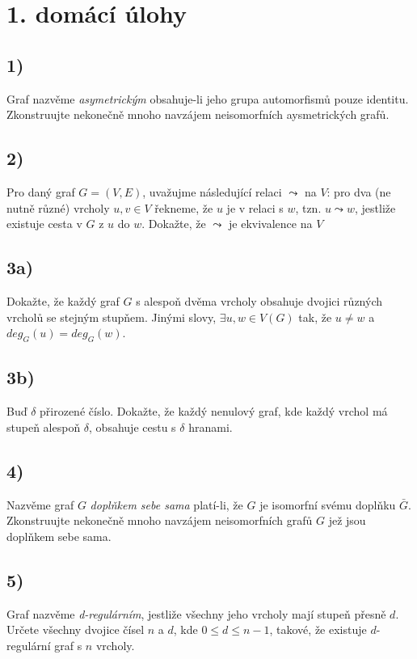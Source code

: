 \documentclass[../main.tex]{subfiles}
\begin{document}
\section*{1. domácí úlohy}

\subsection*{1)}
Graf nazvěme \textit{asymetrickým} obsahuje-li jeho grupa automorfismů pouze identitu.
Zkonstruujte nekonečně mnoho navzájem neisomorfních aysmetrických grafů.

\subsection*{2)}
Pro daný graf $G=(V,E)$, uvažujme následující relaci $\leadsto$ na $V$: pro dva (ne nutně různé) vrcholy $u,v\in V$ řekneme, že 
$u$ je v relaci s $w$, tzn. $u\leadsto w$, jestliže existuje cesta v $G$ z $u$ do $w$. Dokažte, že $\leadsto$ je ekvivalence na $V$



\subsection*{3a)}
Dokažte, že každý graf $G$ s alespoň dvěma vrcholy obsahuje dvojici různých vrcholů se stejným stupňem. Jinými slovy, $\exists u,w \in V(G)$
tak, že $u\neq w$ a $deg_G(u) = deg_G(w)$.



\subsection*{3b)}
Buď $\delta$ přirozené číslo. Dokažte, že každý nenulový graf, kde každý vrchol má stupeň alespoň $\delta$, obsahuje cestu s $\delta$ hranami.


\subsection*{4)}
Nazvěme graf $G$ \textit{doplňkem sebe sama} platí-li, že $G$ je isomorfní svému doplňku $\bar{G}$. 
Zkonstruujte nekonečně mnoho navzájem neisomorfních grafů $G$ jež jsou doplňkem sebe sama.



\subsection*{5)}
Graf nazvěme \textit{d-regulárním}, jestliže všechny jeho vrcholy mají stupeň přesně $d$. 
Určete všechny dvojice čísel $n$ a $d$, kde $0\leq d\leq n-1$, takové, že existuje $d$-regulární graf s $n$ vrcholy.
\end{document}
